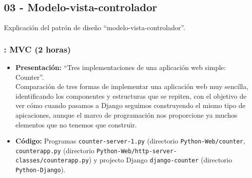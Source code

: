 \documentclass[a4paper,12pt]{article}
\begin{document}

\subsection{03 - Modelo-vista-controlador}

Explicación del patrón de diseño ``modelo-vista-controlador''.

\subsubsection{\juevesJ: MVC (2 horas)}
\label{cal:juevesJ}

\begin{itemize}
\item \textbf{Presentación:} ``Tres implementaciones de una aplicación web simple: Counter''. \\
  Comparación de tres formas de implementar una aplicación web muy sencilla, identificando los componentes y estructuras que se repiten, con el objetivo de ver cómo cuando pasamos a Django seguimos construyendo el mismo tipo de apicaciones, aunque el marco de programación nos proporcione ya muchos elementos que no tenemos que construir.
\item \textbf{Código:} Programas \verb|counter-server-1.py| (directorio \verb|Python-Web/counter|, \verb|counterapp.py| (directorio \verb|Python-Web/http-server-classes/counterapp.py|) y projecto Django \verb|django-counter| (directorio \verb|Python-Django|).
\end{itemize}
\end{document}
